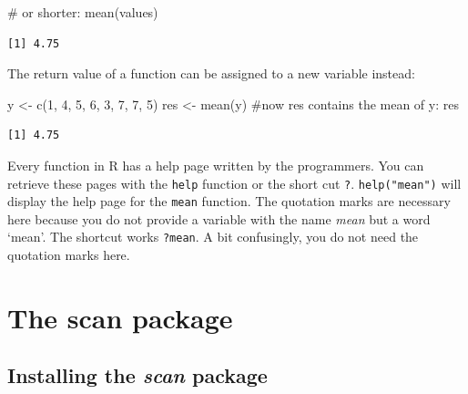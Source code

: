 \documentclass[
  letterpaper,
  DIV=11,
  numbers=noendperiod]{scrreprt}
\newenvironment{Shaded}{\begin{snugshade}}{\end{snugshade}}
\newcommand{\CommentTok}[1]{\textcolor[rgb]{0.37,0.37,0.37}{#1}}
\newcommand{\DecValTok}[1]{\textcolor[rgb]{0.68,0.00,0.00}{#1}}
\newcommand{\FunctionTok}[1]{\textcolor[rgb]{0.28,0.35,0.67}{#1}}
\newcommand{\NormalTok}[1]{\textcolor[rgb]{0.00,0.23,0.31}{#1}}
\newcommand{\OtherTok}[1]{\textcolor[rgb]{0.00,0.23,0.31}{#1}}
\begin{document}
\begin{Shaded}
\begin{Highlighting}[]
\CommentTok{\# or shorter:}
\FunctionTok{mean}\NormalTok{(values)}
\end{Highlighting}
\end{Shaded}

\begin{verbatim}
[1] 4.75
\end{verbatim}

The return value of a function can be assigned to a new variable
instead:

\begin{Shaded}
\begin{Highlighting}[]
\NormalTok{y }\OtherTok{\textless{}{-}} \FunctionTok{c}\NormalTok{(}\DecValTok{1}\NormalTok{, }\DecValTok{4}\NormalTok{, }\DecValTok{5}\NormalTok{, }\DecValTok{6}\NormalTok{, }\DecValTok{3}\NormalTok{, }\DecValTok{7}\NormalTok{, }\DecValTok{7}\NormalTok{, }\DecValTok{5}\NormalTok{)}
\NormalTok{res }\OtherTok{\textless{}{-}} \FunctionTok{mean}\NormalTok{(y)}
\CommentTok{\#now res contains the mean of y:}
\NormalTok{res}
\end{Highlighting}
\end{Shaded}

\begin{verbatim}
[1] 4.75
\end{verbatim}

Every function in R has a help page written by the programmers. You can
retrieve these pages with the \texttt{help} function or the short cut
\texttt{?}. \texttt{help("mean")} will display the help page for the
\texttt{mean} function. The quotation marks are necessary here because
you do not provide a variable with the name \emph{mean} but a word
`mean'. The shortcut works \texttt{?mean}. A bit confusingly, you do not
need the quotation marks here.

\hypertarget{the-scan-package}{%
\chapter{The scan package}\label{the-scan-package}}

\hypertarget{installing-the-scan-package}{%
\section{\texorpdfstring{Installing the \emph{scan}
package}{Installing the scan package}}\label{installing-the-scan-package}}
\end{document}
